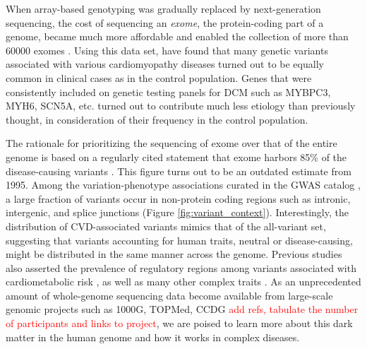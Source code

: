 \documentclass[letter]{bioinfo}
\newcommand{\comment}[1]{\textcolor{red}{#1}}
\begin{document}
When array-based genotyping was gradually replaced by next-generation sequencing, the cost of sequencing an \textit{exome}, the protein-coding part of a genome, became much more affordable and enabled the collection of more than 60000 exomes \citep{Lek:2016:Analysis}. Using this data set, \cite{Walsh:2017:Reassessment} have found that many genetic variants associated with various cardiomyopathy diseases turned out to be equally common in clinical cases as in the control population. Genes that were consistently included on genetic testing panels for DCM such as MYBPC3, MYH6, SCN5A, etc. turned out to contribute much less etiology than previously thought, in consideration of their frequency in the control population.

The rationale for prioritizing the sequencing of exome over that of the entire genome is based on a regularly cited statement that exome harbors 85\% of the disease-causing variants \citep{Antonarakis:2001:nature}. This figure turns out to be an outdated estimate from 1995. Among the variation-phenotype associations curated in the GWAS catalog \citep{MacArthur:2017:new}, a large fraction of variants occur in non-protein coding regions such as intronic, intergenic, and splice junctions (Figure \ref{fig:variant_context}). Interestingly, the distribution of CVD-associated variants mimics that of the all-variant set, suggesting that variants accounting for human traits, neutral or disease-causing, might be distributed in the same manner across the genome. Previous studies also asserted the prevalence of regulatory regions among variants associated with cardiometabolic risk \citep{Franzen:2016:Cardiometabolic}, as well as many other complex traits \citep{Pickrell:2014:Joint}. As an unprecedented amount of whole-genome sequencing data become available from large-scale genomic projects such as 1000G, TOPMed, CCDG \comment{add refs, tabulate the number of participants and links to project}, we are poised to learn more about this dark matter in the human genome and how it works in complex diseases.
\end{document}
